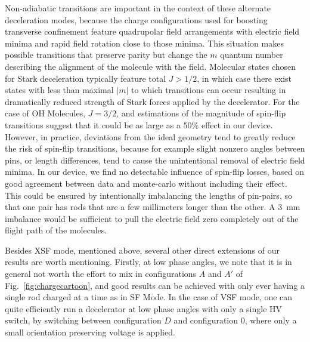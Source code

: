 \documentclass[%
 reprint,
 amsmath,amssymb,
 aps,
prl,
]{revtex4-1}
\begin{document}
Non-adiabatic transitions are important in the context of these alternate deceleration modes, because the charge configurations used for boosting transverse confinement feature quadrupolar field arrangements with electric field minima and rapid field rotation close to those minima.
This situation makes possible transitions that preserve parity but change the $m$ quantum number describing the alignment of the molecule with the field.
Molecular states chosen for Stark deceleration typically feature total $J>1/2$, in which case there exist states with less than maximal $|m|$ to which transitions can occur resulting in dramatically reduced strength of Stark forces applied by the decelerator.
For the case of OH Molecules, $J=3/2$, and estimations of the magnitude of spin-flip transitions suggest that it could be as large as a $50\%$ effect in our device. 
However, in practice, deviations from the ideal geometry tend to greatly reduce the risk of spin-flip transitions, because for example slight nonzero angles between pins, or length differences, tend to cause the unintentional removal of electric field minima.
In our device, we find no detectable influence of spin-flip losses, based on good agreement between data and monte-carlo without including their effect.
This could be ensured by intentionally imbalancing the lengths of pin-pairs, so that one pair has rods that are a few millimeters longer than the other. A $3$~mm imbalance would be sufficient to pull the electric field zero completely out of the flight path of the molecules. 

Besides XSF mode, mentioned above, several other direct extensions of our results are worth mentioning. Firstly, at low phase angles, we note that it is in general not worth the effort to mix in configurations $A$ and $A'$ of Fig.~\ref{fig:chargecartoon}, and good results can be achieved with only ever having a single rod charged at a time as in SF Mode. In the case of VSF mode, one can quite efficiently run a decelerator at low phase angles with only a single HV switch, by switching between configuration $D$ and configuration $0$, where only a small orientation preserving voltage is applied.
\end{document}
